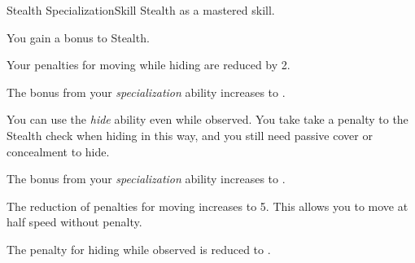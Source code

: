     \begin{feat}{Stealth Specialization}{Skill}
        \featpre Stealth as a mastered skill.

         You gain a  bonus to Stealth.

        \ff[2]{}

         Your penalties for moving while hiding are reduced by 2.

         The bonus from your \textit{specialization} ability increases to .

         You can use the \textit{hide} ability even while observed.
        You take take a  penalty to the Stealth check when hiding in this way, and you still need passive cover or concealment to hide.

         The bonus from your \textit{specialization} ability increases to .

         The reduction of penalties for moving increases to 5.
        This allows you to move at half speed without penalty.

         The penalty for hiding while observed is reduced to .
    \end{feat}

